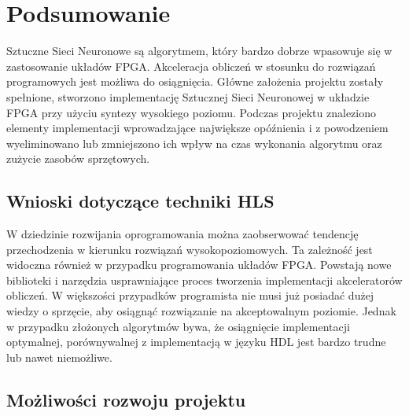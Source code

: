 \newpage %
\cleardoublepage %
\pagestyle{headings}

\section{Podsumowanie}

Sztuczne Sieci Neuronowe są algorytmem, który bardzo dobrze wpasowuje się w zastosowanie układów FPGA. Akceleracja obliczeń w stosunku do rozwiązań programowych jest możliwa do osiągnięcia. Główne założenia projektu zostały spełnione, stworzono implementację Sztucznej Sieci Neuronowej w układzie FPGA przy użyciu syntezy wysokiego poziomu. Podczas projektu znaleziono elementy implementacji wprowadzające największe opóźnienia i z powodzeniem wyeliminowano lub zmniejszono ich wpływ na czas wykonania algorytmu oraz zużycie zasobów sprzętowych.

\subsection{Wnioski dotyczące techniki HLS}
W dziedzinie rozwijania oprogramowania można zaobserwować tendencję przechodzenia w kierunku rozwiązań wysokopoziomowych.
Ta zależność jest widoczna również w przypadku programowania układów FPGA. Powstają nowe biblioteki i narzędzia usprawniające proces tworzenia implementacji akceleratorów obliczeń. W większości przypadków programista nie musi już posiadać dużej wiedzy o sprzęcie, aby osiągnąć rozwiązanie na akceptowalnym poziomie. Jednak w przypadku złożonych algorytmów bywa, że osiągnięcie implementacji optymalnej, porównywalnej z implementacją w języku HDL jest bardzo trudne lub nawet niemożliwe.  

\subsection{Możliwości rozwoju projektu}
